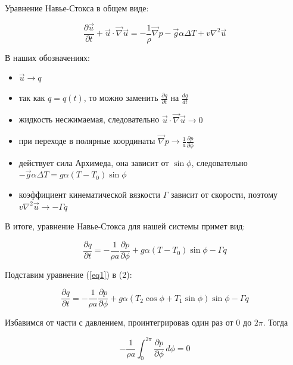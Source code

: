 \documentclass[12pt]{article}
\begin{document}
Уравнение Навье-Стокса в общем виде:

\begin{equation*}
\frac{\partial \overrightarrow{u}}{\partial t} + \overrightarrow{u} \cdot \overrightarrow{\nabla} \overrightarrow{u} = -\frac{1}{\rho} \overrightarrow{\nabla} p - \overrightarrow{g} \alpha \Delta T + v \nabla^2 \overrightarrow{u}
\end{equation*}

В наших обозначениях:
\begin{itemize}
\item $\overrightarrow{u} \rightarrow q$
\item так как $q=q(t)$, то можно заменить $\frac{\partial q}{\partial t}$ на $\frac{dq}{dt}$
\item жидкость несжимаемая, следовательно $\overrightarrow{u} \cdot \overrightarrow{\nabla} \overrightarrow{u} \rightarrow 0$
\item при переходе в полярные координаты $\overrightarrow{\nabla} p \rightarrow \frac{1}{a} \frac{\partial p}{\partial \phi}$
\item действует сила Архимеда, она зависит от $\sin\phi$, следовательно $-\overrightarrow{g} \alpha \Delta T = g \alpha (T-T_0) \sin\phi$
\item коэффициент кинематической вязкости $\Gamma$ зависит от скорости, поэтому $v \nabla^2 \overrightarrow{u} \rightarrow -\Gamma q$
\end{itemize}

В итоге, уравнение Навье-Стокса для нашей системы примет вид:

\begin{equation}\label{eq2}
\frac{\partial q}{\partial t} = -\frac{1}{\rho a}\frac{\partial p}{\partial \phi} + g \alpha (T-T_0) \sin\phi -\Gamma q
\end{equation}

Подставим уравнение (\ref{eq1}) в (2):

\begin{equation*}
\frac{\partial q}{\partial t} = -\frac{1}{\rho a}\frac{\partial p}{\partial \phi} + g \alpha (T_2\cos\phi + T_1\sin\phi) \sin\phi -\Gamma q
\end{equation*}

Избавимся от части с давлением, проинтегрировав один раз от 0 до $2\pi$. Тогда 

\begin{equation*}
-\frac{1}{\rho a} \int_{0}^{2\pi} \frac{\partial p}{\partial \phi}\, d\phi = 0
\end{equation*}
\end{document}
